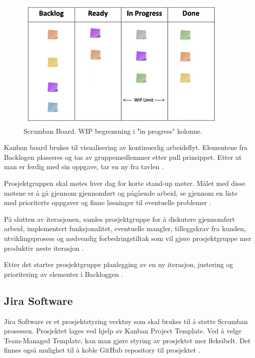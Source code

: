  
\begin{figure}[ht]
\centering
\includegraphics{images/fig-scrumban-board.png}
\caption{Scrumban Board. WIP begrensning i "in progress" kolonne. \cite{4-logrocket.com-scrumban}}
\label{fig:fig-scrumban-board}
\end{figure}
 

Kanban board brukes til visualisering av kontinuerlig arbeidsflyt. Elementene fra Backlogen plasseres og tas av gruppemedlemmer etter pull prinsippet. Etter at man er ferdig med sin oppgave, tar en ny fra tavlen \cite{6-scrum-vs-kanban-vs-scrumban}.

Prosjektgruppen skal møtes hver dag for korte stand-up møter. Målet med disse møtene er å gå gjennom gjennomført og pågående arbeid, se gjennom en liste med prioriterte oppgaver og finne løsninger til eventuelle problemer \cite{4-logrocket.com-scrumban}.

På slutten av iterasjonen, samles prosjektgruppe for å diskutere gjennomført arbeid, implementert funksjonalitet, eventuelle mangler, tilleggskrav fra kunden, utviklingsprosess og nødvendig forbedringstiltak som vil gjøre prosjektgruppe mer produktiv neste iterasjon \cite{6-agilealliance-scrumban}.

Etter det starter prosjektgruppe planlegging av en ny iterasjon, justering og prioritering av elementer i Backloggen \cite{6-agilealliance-scrumban}.

\subsection{Jira Software}

Jira Software er et prosjektstyring verktøy som skal brukes til å støtte Scrumban prosessen. Prosjektet lages ved hjelp av Kanban Project Template. Ved å velge Team-Managed Template, kan man gjøre styring av prosjektet mer fleksibelt. Det finnes også mulighet til å koble GitHub repository til prosjektet \cite{4-atlassian.com-jira}.

